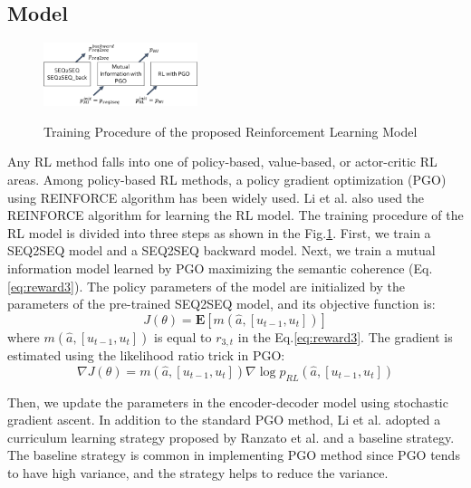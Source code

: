 \subsection{Model}
\begin{figure}[b!]
    \centering
    \includegraphics[width=0.4\textwidth]{three_steps.png} 
    \label{fig:three_steps}
    \caption{\small Training Procedure of the proposed Reinforcement Learning Model}
 \end{figure}
Any RL method falls into one of policy-based, value-based, or actor-critic RL areas. Among policy-based RL methods, a policy gradient optimization (PGO) using REINFORCE algorithm \cite{Williams} has been widely used. Li et al. also used the REINFORCE algorithm for learning the RL model. The training procedure of the RL model is divided into three steps as shown in the Fig.\ref{fig:three_steps}. First, we train a SEQ2SEQ model and a SEQ2SEQ backward model. Next, we train a mutual information model learned by PGO maximizing the semantic coherence (Eq.\ref{eq:reward3}). The policy parameters of the model are initialized by the parameters of the pre-trained SEQ2SEQ model, and its objective function is:
\begin{equation}
	J(\theta)= 	\mathbf{E} [m(\hat{a},[u_{t-1},u_t])] \label{eq:obj_func}
\end{equation}
where $m(\hat{a},[u_{t-1},u_t])$ is equal to $r_{3,t}$ in the Eq.\ref{eq:reward3}. The gradient is estimated using the likelihood ratio trick in PGO:
\begin{equation}
	\nabla J(\theta) = m(\hat{a},[u_{t-1},u_t]) \nabla \log p_{RL}(\hat{a},[u_{t-1},u_t]) \label{eq:gradient}
\end{equation}

Then, we update the parameters in the encoder-decoder model using stochastic gradient ascent. In addition to the standard PGO method, Li et al. adopted a curriculum learning strategy proposed by Ranzato et al. \cite{Ranzato} and a baseline strategy. The baseline strategy is common in implementing PGO method since PGO tends to have high variance, and the strategy helps to reduce the variance.

